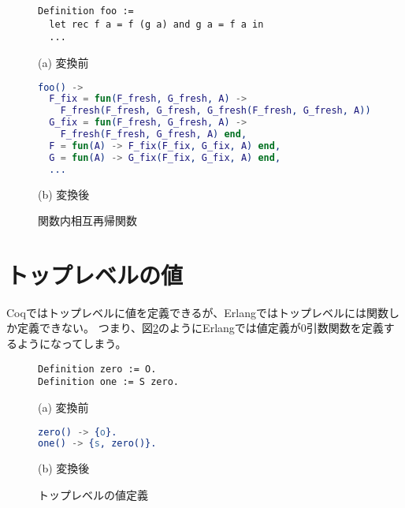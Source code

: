\begin{figure}\centering
\begin{minipage}{1\textwidth}\centering
\begin{lstlisting}[frame=single,numbers=none,xleftmargin=0pt]
Definition foo :=
  let rec f a = f (g a) and g a = f a in
  ...
\end{lstlisting}
(a) 変換前
\end{minipage}
\begin{minipage}{1\textwidth}\centering
\begin{lstlisting}[frame=single,numbers=none,xleftmargin=0pt,language=Erlang]
foo() ->
  F_fix = fun(F_fresh, G_fresh, A) ->
    F_fresh(F_fresh, G_fresh, G_fresh(F_fresh, G_fresh, A)) end,
  G_fix = fun(F_fresh, G_fresh, A) ->
    F_fresh(F_fresh, G_fresh, A) end,
  F = fun(A) -> F_fix(F_fix, G_fix, A) end,
  G = fun(A) -> G_fix(F_fix, G_fix, A) end,
  ...
\end{lstlisting}
(b) 変換後
\end{minipage}
\label{code:extraction:recursive}
\caption{関数内相互再帰関数}
\end{figure}

\section{トップレベルの値}

Coqではトップレベルに値を定義できるが、Erlangではトップレベルには関数しか定義できない。
つまり、図\ref{code:extraction:toplevel-value-impossible}のようにErlangでは値定義が0引数関数を定義するようになってしまう。

\begin{figure}\centering
\begin{minipage}{0.4\textwidth}\centering
\begin{lstlisting}[frame=single,numbers=none,xleftmargin=0pt]
Definition zero := O.
Definition one := S zero.
\end{lstlisting}
(a) 変換前
\end{minipage}
\hspace*{3ex}
\begin{minipage}{0.4\textwidth}\centering
\begin{lstlisting}[frame=single,numbers=none,xleftmargin=0pt,language=Erlang]
zero() -> {o}.
one() -> {s, zero()}.
\end{lstlisting}
(b) 変換後
\end{minipage}
\label{code:extraction:toplevel-value-impossible}
\caption{トップレベルの値定義}
\end{figure}

